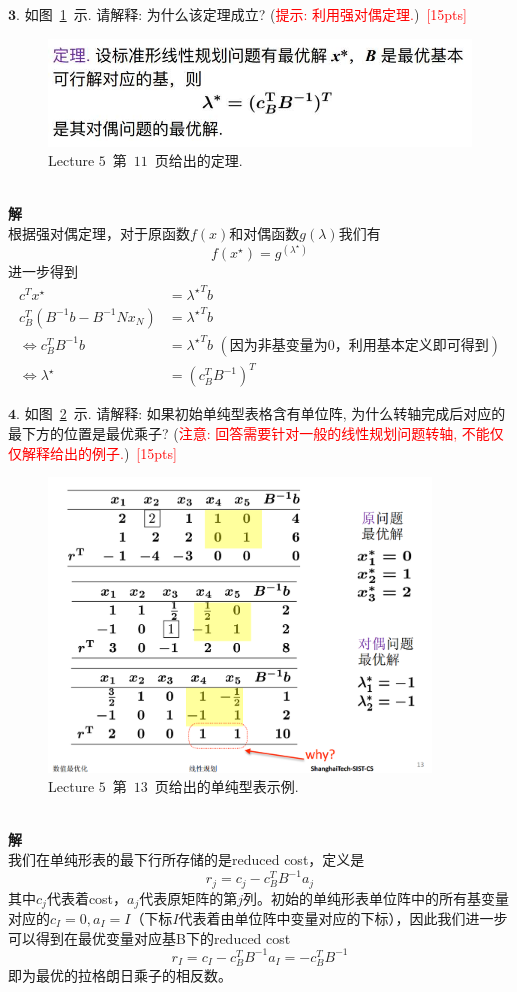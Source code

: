 \documentclass[10pt]{article}
\begin{document}
$\bm{3}.$ 
如图~\ref{fig: thm}~示.  请解释: 为什么该定理成立? (\textcolor{red}{提示: 利用强对偶定理.})~\textcolor{red}{[15pts]}
\begin{figure}[h!]
	\centering
	\includegraphics[width=5in]{thm.jpg}
	\caption{Lecture $5$~第~$11$~页给出的定理.}
	\label{fig: thm}
\end{figure}\\
\textbf{解}\\
根据强对偶定理，对于原函数$f(x)$和对偶函数$g(\lambda)$我们有
$$f(x^\star) = g^(\lambda^\star)$$
进一步得到
\begin{align*}
	c^T x^\star &= {\lambda^\star}^Tb \\
	c_B^T(B^{-1}b-B^{-1}Nx_N) &={\lambda^\star}^Tb \\
	\Leftrightarrow c_B^TB^{-1}b&={\lambda^\star}^Tb \,\,(\text{因为非基变量为0，利用基本定义即可得到})\\
	\Leftrightarrow \lambda^\star &= (c_B^TB^{-1})^T
\end{align*}

$\bm{4}.$
如图~\ref{fig: pivot}~示. 请解释: 如果初始单纯型表格含有单位阵, 为什么转轴完成后对应的最下方的位置是最优乘子? (\textcolor{red}{注意: 回答需要针对一般的线性规划问题转轴, 不能仅仅解释给出的例子.})~\textcolor{red}{[15pts]}
\begin{figure}[h!]
	\centering
	\includegraphics[width=4in]{pivot.jpg}
	\caption{Lecture $5$~第~$13$~页给出的单纯型表示例.}
	\label{fig: pivot}
\end{figure}\\
\textbf{解}\\
我们在单纯形表的最下行所存储的是reduced cost，定义是
$$r_j=c_j-c_B^TB^{-1}a_j$$
其中$c_j$代表着cost，$a_j$代表原矩阵的第$j$列。初始的单纯形表单位阵中的所有基变量对应的$c_{I} = 0, a_{I} = I$（下标$I$代表着由单位阵中变量对应的下标），因此我们进一步可以得到在最优变量对应基B下的reduced cost
	$$r_{I} = c_{I}-c_B^TB^{-1}a_{I} = -c_B^TB^{-1}$$
	即为最优的拉格朗日乘子的相反数。
\end{document}
